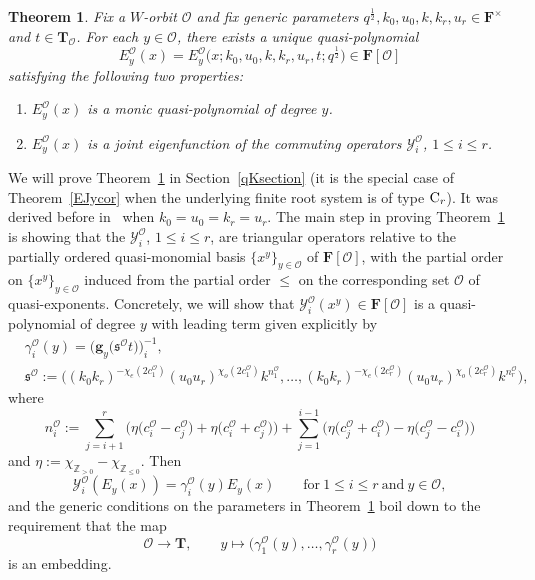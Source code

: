 \documentclass[pdftex]{sigma}
\numberwithin{equation}{section}
\newtheorem{Theorem}{Theorem}[section]
\begin{document}
{\begin{Theorem}\label{TheoremC}
Fix a $W$-orbit $\mathcal{O}$ and fix generic parameters $q^{\frac{1}{2}},k_0,u_0,k,k_r,u_r\in\mathbf{F}^\times$ and $t\in\mathbf{T}_{\mathcal{O}}$. For each $y\in\mathcal{O}$, there exists a unique quasi-polynomial
\[
E_y^{\mathcal{O}}(x)=E_y^{\mathcal{O}}\bigl(x;k_0,u_0,k,k_r,u_r,t;q^{\frac{1}{2}}\bigr)\in\mathbf{F}[\mathcal{O}]
\]
satisfying the following two properties:
\begin{enumerate}\itemsep=0pt
\item[$(1)$] $E_y^{\mathcal{O}}(x)$ is a monic quasi-polynomial of degree $y$.
\item[$(2)$] $E_y^{\mathcal{O}}(x)$ is a joint eigenfunction of the commuting operators $\mathcal{Y}_i^{\mathcal{O}}$, $1\leq i\leq r$.
\end{enumerate}
\end{Theorem}

We will prove Theorem~\ref{TheoremC} in Section~\ref{qKsection} (it is the special case of Theorem~\ref{EJycor} when the underlying finite root system is of type ${\rm C}_r$). It was derived before in~\cite{SSV2} when $k_0=u_0=k_r=u_r$.
The main step in proving Theorem~\ref{TheoremC} is showing that the $\mathcal{Y}_i^{\mathcal{O}}$, $1\leq i\leq r$, are triangular operators relative to
the partially ordered quasi-monomial basis $\{x^y\}_{y\in\mathcal{O}}$ of $\mathbf{F}[\mathcal{O}]$, with the partial order on $\{x^y\}_{y\in\mathcal{O}}$ induced from the partial order $\leq$ on the corresponding set $\mathcal{O}$ of quasi-exponents. Concretely, we will show that $\mathcal{Y}_i^{\mathcal{O}}(x^y)\in\mathbf{F}[\mathcal{O}]$ is a quasi-polynomial of degree $y$ with leading term  given explicitly by
\begin{align*}
&\gamma_i^{\mathcal{O}}(y)=\bigl(\mathbf{g}_y\bigl(\mathfrak{s}^{\mathcal{O}}t\bigr)\bigr)_i^{-1},\\
&\mathfrak{s}^{\mathcal{O}}:=\bigl((k_0k_r)^{-\chi_e(2c_1^{\mathcal{O}})}(u_0u_r)^{\chi_o(2c_1^{\mathcal{O}})}k^{n_1^{\mathcal{O}}},
\dots,(k_0k_r)^{-\chi_e(2c_r^{\mathcal{O}})}(u_0u_r)^{\chi_o(2c_r^{\mathcal{O}})}k^{n_r^{\mathcal{O}}}\bigr),
\end{align*}
where
\[
n_i^{\mathcal{O}}:=\sum_{j=i+1}^r\bigl(\eta\bigl(c_i^{\mathcal{O}}-c_j^{\mathcal{O}}\bigr)+\eta\bigl(c_i^{\mathcal{O}}+c_j^{\mathcal{O}}\bigr)\bigr)+
\sum_{j=1}^{i-1}\bigl(\eta\bigl(c_j^{\mathcal{O}}+c_i^{\mathcal{O}}\bigr)-\eta\bigl(c_j^{\mathcal{O}}-c_i^{\mathcal{O}}\bigr)\bigr)
\]
and $\eta:=\chi_{\mathbb{Z}_{>0}}-\chi_{\mathbb{Z}_{\leq 0}}$. Then
\[
\mathcal{Y}_i^\mathcal{O}(E_y(x))=\gamma_i^\mathcal{O}(y)E_y(x)\qquad \text{for}\ 1\leq i\leq r\ \text{and}\ y\in\mathcal{O},
\]
and the generic conditions on the parameters in Theorem~\ref{TheoremC} boil down to the requirement that the map
\[
\mathcal{O}\rightarrow\mathbf{T},\qquad y\mapsto \bigl(\gamma_1^{\mathcal{O}}(y),\dots,\gamma_r^{\mathcal{O}}(y)\bigr)
\]
is an embedding.

}
\end{document}

